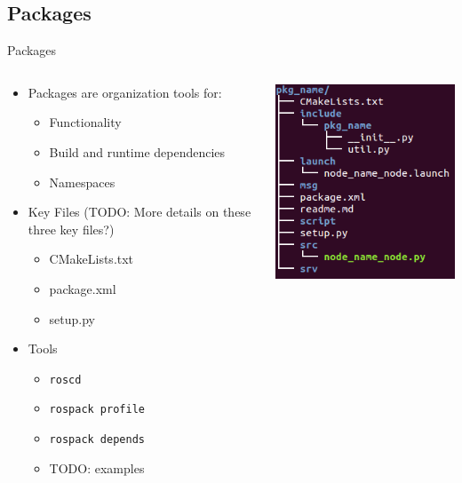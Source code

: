 \documentclass{beamer}
\begin{document}
\subsection{Packages}
\begin{frame}{Packages}
\begin{columns}
	\begin{column}{0.6\textwidth}
		\begin{itemize}
			\item Packages are organization tools for:
			\begin{itemize}
				\item Functionality
				\item Build and runtime dependencies
				\item Namespaces
			\end{itemize}
			\item Key Files (TODO: More details on these three key files?)
				\begin{itemize}
					\item CMakeLists.txt
					\item package.xml
					\item setup.py
				\end{itemize}
			\item Tools
				\begin{itemize}
					\item \texttt{roscd}
					\item \texttt{rospack profile}
					\item \texttt{rospack depends}
					\item TODO: examples
				\end{itemize}
		\end{itemize}
	\end{column}
	\begin{column}{0.4\textwidth}
		\centering
		\includegraphics[width=\textwidth]{fig/pkg_tree.png}

\end{column}
\end{columns}
\end{frame}
\end{document}
